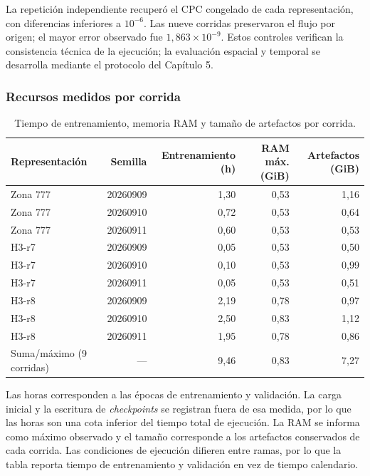La repetición independiente recuperó el CPC congelado de cada representación, con diferencias inferiores a $10^{-6}$. Las nueve corridas preservaron el flujo por origen; el mayor error observado fue $1{,}863\times10^{-9}$. Estos controles verifican la consistencia técnica de la ejecución; la evaluación espacial y temporal se desarrolla mediante el protocolo del Capítulo 5.

\subsubsection*{Recursos medidos por corrida}

\begin{table}[H]
  \centering
  \small
  \caption{Tiempo de entrenamiento, memoria RAM y tamaño de artefactos por corrida.}
  \label{tab:anexo_recursos}
  \begin{tabular}{@{}lrrrr@{}}
    \toprule
    \textbf{Representación} & \textbf{Semilla} & \textbf{Entrenamiento (h)} & \textbf{RAM máx. (GiB)} & \textbf{Artefactos (GiB)} \\
    \midrule
    Zona 777 & 20260909 & 1,30 & 0,53 & 1,16 \\
    Zona 777 & 20260910 & 0,72 & 0,53 & 0,64 \\
    Zona 777 & 20260911 & 0,60 & 0,53 & 0,53 \\
    H3-r7    & 20260909 & 0,05 & 0,53 & 0,50 \\
    H3-r7    & 20260910 & 0,10 & 0,53 & 0,99 \\
    H3-r7    & 20260911 & 0,05 & 0,53 & 0,51 \\
    H3-r8    & 20260909 & 2,19 & 0,78 & 0,97 \\
    H3-r8    & 20260910 & 2,50 & 0,83 & 1,12 \\
    H3-r8    & 20260911 & 1,95 & 0,78 & 0,86 \\
    \midrule
    Suma/máximo (9 corridas) & --- & 9,46 & 0,83 & 7,27 \\
    \bottomrule
  \end{tabular}
\end{table}

Las horas corresponden a las épocas de entrenamiento y validación. La carga inicial y la escritura de \textit{checkpoints} se registran fuera de esa medida, por lo que las horas son una cota inferior del tiempo total de ejecución. La RAM se informa como máximo observado y el tamaño corresponde a los artefactos conservados de cada corrida. Las condiciones de ejecución difieren entre ramas, por lo que la tabla reporta tiempo de entrenamiento y validación en vez de tiempo calendario.

